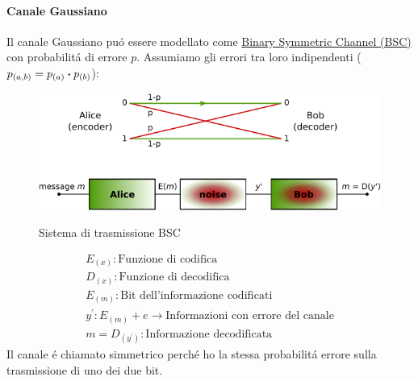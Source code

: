         \paragraph{Canale Gaussiano}
            Il canale Gaussiano puó essere modellato come \href{https://en.wikipedia.org/wiki/Binary_symmetric_channel}{Binary Symmetric Channel (BSC)} con probabilitá di errore $p$. 
            Assumiamo gli errori tra loro indipendenti ($p_{(a,b)} = p_{(a)}\dotproduct p_{(b)}$):
        \begin{figure}[H]
            \centering
            \includegraphics[width = 12cm]{media/600px-Binary_symmetric_channel_(en).svg.png}
            \label{BSC system}
            \caption{Sistema di trasmissione BSC}
        \end{figure}
        \begin{gather}
            E_{(x)}: \text{Funzione di codifica} \nonumber \\
            D_{(x)}: \text{Funzione di decodifica} \nonumber \\
            E_{(m)}: \text{Bit dell'informazione codificati} \nonumber \\
            y^\prime: E_{(m)}+ e \rightarrow \text{Informazioni con errore del canale} \nonumber \\
            m = D_{(y^\prime)}: \text{Informazione decodificata} \nonumber 
        \end{gather}
        Il canale é chiamato simmetrico perché ho la stessa probabilitá errore sulla trasmissione di uno dei due bit. 
